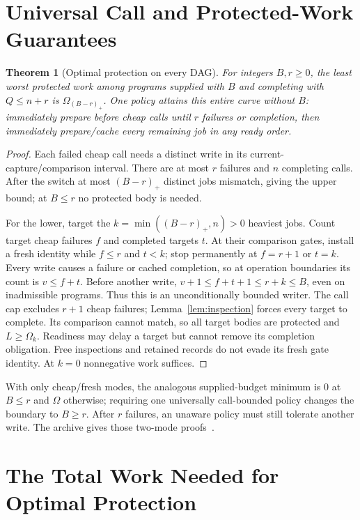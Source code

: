 \documentclass[acmsmall,screen,review,anonymous]{acmart}
\newtheorem{theorem}{Theorem}
\begin{document}
\section{Universal Call and Protected-Work Guarantees}
\label{sec:resources}

\begin{theorem}[Optimal protection on every DAG]
\label{thm:resources}\label{thm:universal}
For integers $B,r\ge0$, the least worst protected work among programs supplied with $B$ and completing with $Q\le n+r$ is $\Omega_{(B-r)_+}$. One policy attains this entire curve without $B$: immediately prepare before cheap calls until $r$ failures or completion, then immediately prepare/cache every remaining job in any ready order.
\end{theorem}
\begin{proof}
Each failed cheap call needs a distinct write in its current-capture/comparison interval. There are at most $r$ failures and $n$ completing calls. After the switch at most $(B-r)_+$ distinct jobs mismatch, giving the upper bound; at $B\le r$ no protected body is needed.

For the lower, target the $k=\min((B-r)_+,n)>0$ heaviest jobs. Count target cheap failures $f$ and completed targets $t$. At their comparison gates, install a fresh identity while $f\le r$ and $t<k$; stop permanently at $f=r+1$ or $t=k$. Every write causes a failure or cached completion, so at operation boundaries its count is $v\le f+t$. Before another write, $v+1\le f+t+1\le r+k\le B$, even on inadmissible programs. Thus this is an unconditionally bounded writer. The call cap excludes $r+1$ cheap failures; Lemma~\ref{lem:inspection} forces every target to complete. Its comparison cannot match, so all target bodies are protected and $L\ge\Omega_k$. Readiness may delay a target but cannot remove its completion obligation. Free inspections and retained records do not evade its fresh gate identity. At $k=0$ nonnegative work suffices.
\end{proof}

With only cheap/fresh modes, the analogous supplied-budget minimum is $0$ at $B\le r$ and $\Omega$ otherwise; requiring one universally call-bounded policy changes the boundary to $B\ge r$. After $r$ failures, an unaware policy must still tolerate another write. The archive gives those two-mode proofs~\cite{chargedartifact}.

\section{The Total Work Needed for Optimal Protection}
\label{sec:joint}
\end{document}
